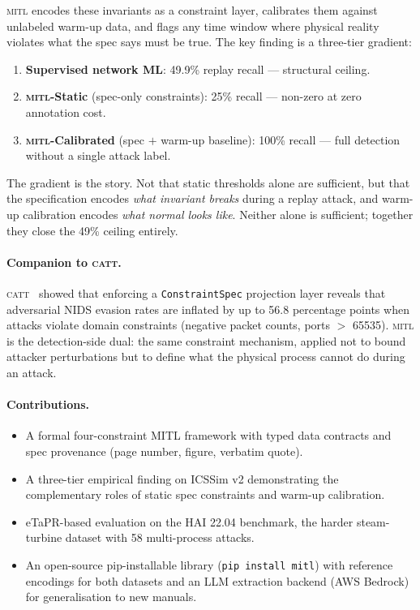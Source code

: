 \documentclass[sigconf,anonymous,review]{acmart}
\newcommand{\mitl}{\textsc{mitl}\xspace}
\newcommand{\catt}{\textsc{catt}\xspace}
\begin{document}
\mitl encodes these invariants as a constraint layer, calibrates them
against unlabeled warm-up data, and flags any time window where physical
reality violates what the spec says must be true.  The key finding is a
three-tier gradient:
\begin{enumerate}
  \item \textbf{Supervised network ML}: 49.9\% replay recall — structural ceiling.
  \item \textbf{\mitl-Static} (spec-only constraints): 25\% recall — non-zero
        at zero annotation cost.
  \item \textbf{\mitl-Calibrated} (spec $+$ warm-up baseline): 100\% recall —
        full detection without a single attack label.
\end{enumerate}

The gradient is the story.  Not that static thresholds alone are sufficient,
but that the specification encodes \emph{what invariant breaks} during a
replay attack, and warm-up calibration encodes \emph{what normal looks like}.
Neither alone is sufficient; together they close the 49\% ceiling entirely.

\paragraph{Companion to \catt.}
\catt~\cite{catt2026} showed that enforcing a \texttt{ConstraintSpec}
projection layer reveals that adversarial NIDS evasion rates are inflated by
up to 56.8 percentage points when attacks violate domain constraints (negative
packet counts, ports $>$ 65535).  \mitl is the detection-side dual: the same
constraint mechanism, applied not to bound attacker perturbations but to
define what the physical process cannot do during an attack.

\paragraph{Contributions.}
\begin{itemize}
  \item A formal four-constraint MITL framework with typed data contracts and
        spec provenance (page number, figure, verbatim quote).
  \item A three-tier empirical finding on ICSSim v2 demonstrating the
        complementary roles of static spec constraints and warm-up calibration.
  \item eTaPR-based evaluation on the HAI 22.04 benchmark, the harder
        steam-turbine dataset with 58 multi-process attacks.
  \item An open-source pip-installable library (\texttt{pip install mitl})
        with reference encodings for both datasets and an LLM extraction
        backend (AWS Bedrock) for generalisation to new manuals.
\end{itemize}
\end{document}
